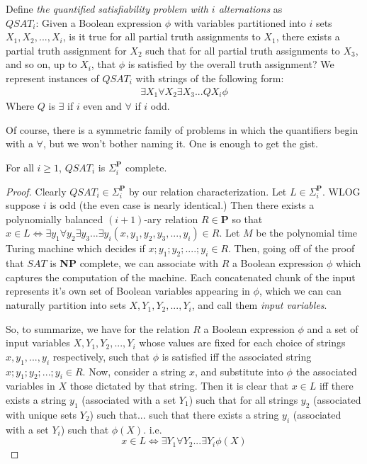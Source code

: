 \begin{problem}
    Define \textit{the quantified satisfiability problem with $i$ alternations} as\\
    $QSAT_i$: Given a Boolean expression $\phi$ with variables partitioned into $i$ sets $X_1,X_2,...,X_i$, is it true for all partial truth assignments to $X_1$, there exists a partial truth assignment for $X_2$ such that for all partial truth assignments to $X_3$, and so on, up to $X_i$, that $\phi$ is satisfied by the overall truth assignment? We represent instances of $QSAT_i$ with strings of the following form:
    \begin{align}
        \exists X_1 \forall X_2 \exists X_3... QX_i \phi
    \end{align}
    Where $Q$ is $\exists$ if $i$ even and $\forall$ if $i$ odd.
\end{problem}
Of course, there is a symmetric family of problems in which the quantifiers begin with a $\forall$, but we won't bother naming it. One is enough to get the gist.
\begin{theorem}
    For all $i \geq 1$, $QSAT_i$ is $\Sigma_i^{\textbf{P}}$ complete.
\end{theorem}
\begin{proof}
    Clearly $QSAT_i \in \Sigma_i^{\textbf{P}}$ by our relation characterization.
    Let $L \in \Sigma_i^{\textbf{P}}$. WLOG suppose $i$ is odd (the even case is nearly identical.) Then there exists a polynomially balanced $(i+1)$-ary relation $R \in \textbf{P}$ so that $x \in L \iff \exists y_1 \forall y_2 \exists y_3 ... \exists y_i(x,y_1,y_2,y_3,...,y_i) \in R$. Let $M$ be the polynomial time Turing machine which decides if $x;y_1;y_2;....;y_i \in R$. Then, going off of the proof that $SAT$ is \textbf{NP} complete, we can associate with $R$ a Boolean expression $\phi$ which captures the computation of the machine. Each concatenated chunk of the input represents it's own set of Boolean variables appearing in $\phi$, which we can can naturally partition into sets $X,Y_1,Y_2,...,Y_i$, and call them \textit{input variables}.
    \par So, to summarize, we have for the relation $R$ a Boolean expression $\phi$ and a set of input variables $X,Y_1,Y_2,...,Y_i$ whose values are fixed for each choice of strings $x,y_1,...,y_i$ respectively, such that $\phi$ is satisfied iff the associated string $x;y_1;y_2;...;y_i \in R$. Now, consider a string $x$, and substitute into $\phi$ the associated variables in $X$ those dictated by that string. Then it is clear that $x \in L$ iff there exists a string $y_1$ (associated with a set $Y_1$) such that for all strings $y_2$ (associated with unique sets $Y_2$) such that... such that there exists a string $y_i$ (associated with a set $Y_i$) such that $\phi(X)$. i.e. 
    \[ x \in L \iff \exists Y_1 \forall Y_2... \exists Y_i \phi(X) \]
\end{proof}
